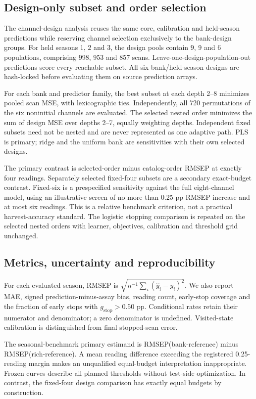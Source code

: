 \documentclass[Review,sagev,times]{sagej}
\begin{document}
\subsection{Design-only subset and order selection}
The channel-design analysis reuses the same core, calibration and held-season predictions while reserving channel selection exclusively to the bank-design groups. For held seasons 1, 2 and 3, the design pools contain 9, 9 and 6 populations, comprising 998, 953 and 857 scans. Leave-one-design-population-out predictions score every reachable subset. All six bank/held-season designs are hash-locked before evaluating them on source prediction arrays.

For each bank and predictor family, the best subset at each depth 2--8 minimizes pooled scan MSE, with lexicographic ties. Independently, all 720 permutations of the six noninitial channels are evaluated. The selected nested order minimizes the sum of design MSE over depths 2--7, equally weighting depths. Independent fixed subsets need not be nested and are never represented as one adaptive path. PLS is primary; ridge and the uniform bank are sensitivities with their own selected designs.

The primary contrast is selected-order minus catalog-order RMSEP at exactly four readings. Separately selected fixed-four subsets are a secondary exact-budget contrast. Fixed-six is a prespecified sensitivity against the full eight-channel model, using an illustrative screen of no more than 0.25-pp RMSEP increase and at most six readings. This is a relative benchmark criterion, not a practical harvest-accuracy standard. The logistic stopping comparison is repeated on the selected nested orders with learner, objectives, calibration and threshold grid unchanged.

\subsection{Metrics, uncertainty and reproducibility}
For each evaluated season, RMSEP is $\sqrt{n^{-1}\sum_i(\hat y_i-y_i)^2}$. We also report MAE, signed prediction-minus-assay bias, reading count, early-stop coverage and the fraction of early stops with $g_{\mathrm{stop}}>0.50$ pp. Conditional rates retain their numerator and denominator; a zero denominator is undefined. Visited-state calibration is distinguished from final stopped-scan error.

The seasonal-benchmark primary estimand is RMSEP(bank-reference) minus RMSEP(rich-reference). A mean reading difference exceeding the registered 0.25-reading margin makes an unqualified equal-budget interpretation inappropriate. Frozen curves describe all planned thresholds without test-side optimization. In contrast, the fixed-four design comparison has exactly equal budgets by construction.
\end{document}
